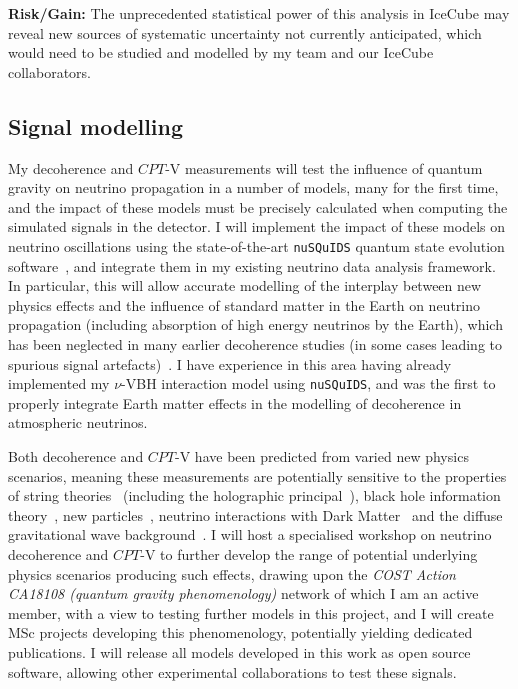 \documentclass[a4paper,11pt]{article}
\begin{document}
\textbf{Risk/Gain:} The unprecedented statistical power of this analysis in IceCube may reveal new sources of systematic uncertainty not currently anticipated, which would need to be studied and modelled by my team and our IceCube collaborators. \\

\subsection{Signal modelling}

My decoherence and $CPT$-V measurements will test the influence of quantum gravity on neutrino propagation in a number of models, many for the first time, and the impact of these models must be precisely calculated when computing the simulated signals in the detector. I will implement the impact of these models on neutrino oscillations using the state-of-the-art \texttt{nuSQuIDS} quantum state evolution software~\cite{Delgado:2014kpa, nusquidsGIT}, and integrate them in my existing neutrino data analysis framework. In particular, this will allow accurate modelling of the interplay between new physics effects and the influence of standard matter in the Earth on neutrino propagation (including absorption of high energy neutrinos by the Earth), which has been neglected in many earlier decoherence studies (in some cases leading to spurious signal artefacts)~\cite{PhysRevD.97.115017}. I have experience in this area having already implemented my $\nu$-VBH interaction model using \texttt{nuSQuIDS}, and was the first to properly integrate Earth matter effects in the modelling of decoherence in atmospheric neutrinos.

Both decoherence and $CPT$-V have been predicted from varied new physics scenarios, meaning these measurements are potentially sensitive to the properties of string theories~\cite{Mavromatos2010, AmelinoCamelia:2008qg} (including the holographic principal~\cite{Perlman_2015, Harlow:2018jwu}), black hole information theory~\cite{PhysRevD.102.115003, Hellmann:2021jyz}, new particles~\cite{Hellmann:2021jyz}, neutrino interactions with Dark Matter~\cite{1909.11271, EPJC802020, Capozzi:2018bps, 1904.02518} and the diffuse gravitational wave background~\cite{PhysRevD.100.096014}. I will host a specialised workshop on neutrino decoherence and $CPT$-V to further develop the range of potential underlying physics scenarios producing such effects, drawing upon the \textit{COST Action CA18108 (quantum gravity phenomenology)} network of which I am an active member, with a view to testing further models in this project, and I will create MSc projects developing this phenomenology, potentially yielding dedicated publications. I will release all models developed in this work as open source software, allowing other experimental collaborations to test these signals.  \\
\end{document}
